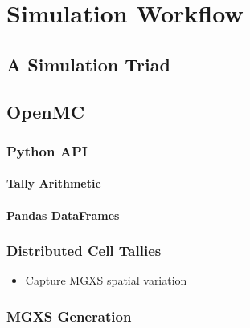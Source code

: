 \chapter{Simulation Workflow}
\label{chap:workflow}

\section{A Simulation Triad}
\label{chap3:triad}


\section{OpenMC}
\label{sec:chap3-openmc}

\subsection{Python API}
\label{sec:chap3-py-api}

\subsubsection{Tally Arithmetic}
\label{sec:chap3-tally-arithmetic}

\subsubsection{Pandas DataFrames}
\label{sec:chap3-pandas-df}

\subsection{Distributed Cell Tallies}
\label{sec:chap3-distribcells}

\begin{itemize}
  \item Capture \ac{MGXS} spatial variation
\end{itemize}

\subsection{MGXS Generation}
\label{sec:chap3-mgxs}

